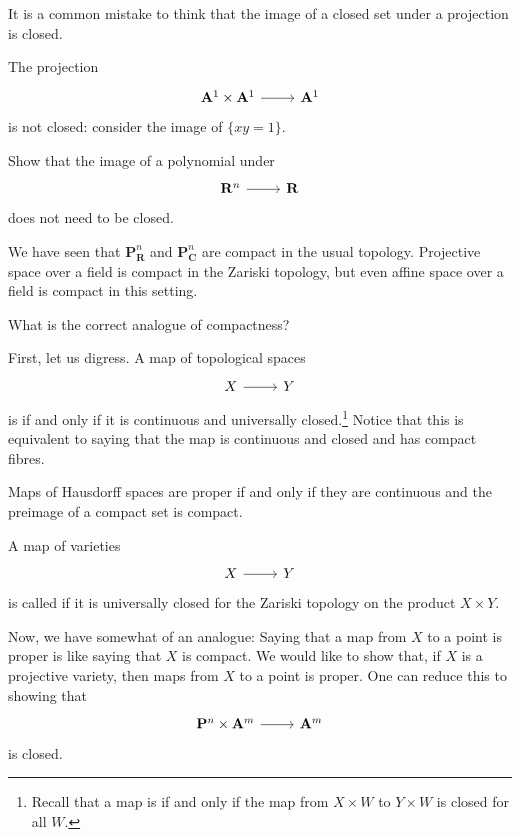 \documentclass [11 pt, oneside] {article}
\begin{document}
\begin{remark}
	It is a common mistake to think that the image of a closed set under a projection is closed.
\end{remark}

\begin{example}[ ]\label{}\text{}
The projection 
\[
\begin{tikzcd}
\mathbf{A}^1\times \mathbf{A}^1 \ar[r]& \mathbf{A}^1
\end{tikzcd}
\] 
is not closed: consider the image of $\{xy=1\}$.
\end{example}

\begin{exercise}\label{}\text{}
Show that the image of a polynomial under 
\[
\begin{tikzcd}
\mathbf{R}^n\ar[r]& \mathbf{R}
\end{tikzcd}
\]
does not need to be closed.
\end{exercise}

We have seen that $\mathbf{P}^n_{\mathbf{R}}$ and $\mathbf{P}^n_{\mathbf{C}}$ are compact in the usual topology. Projective space over a field is compact in the Zariski topology, but even affine space over a field is compact in this setting.

\begin{problem}
	What is the correct analogue of compactness?
\end{problem}

First, let us digress. A map of topological spaces 
\[
\begin{tikzcd}
X\ar[r]&Y
\end{tikzcd}
\]
is  if and only if it is continuous and universally closed.\footnote{Recall that a map is  if and only if the map from $X\times W$ to $Y\times W$ is closed for all $W$.} Notice that this is equivalent to saying that the map is continuous and closed and has compact fibres.

Maps of Hausdorff spaces are proper if and only if they are continuous and the preimage of a compact set is compact.

A map of varieties 
\[
\begin{tikzcd}
X\ar[r]&Y
\end{tikzcd}
\]
 is called  if it is universally closed for the Zariski topology on the product $X\times Y$. 

Now, we have somewhat of an analogue: Saying that a map from $X$ to a point is proper is like saying that $X$ is compact. We would like to show that, if $X$ is a projective variety, then maps from $X$ to a point is proper. One can reduce this to showing that 
\[
\begin{tikzcd}
\mathbf{P}^n\times \mathbf{A}^m\ar[r]& \mathbf{A}^m
\end{tikzcd}
\]
is closed.
\end{document}
